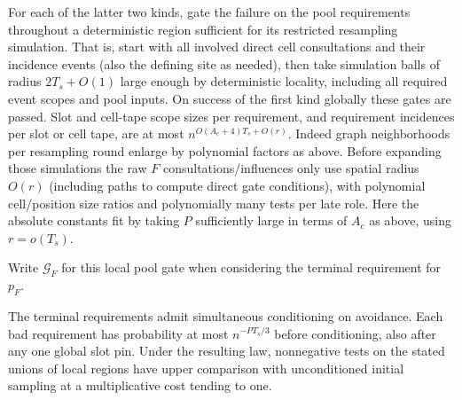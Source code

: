 For each of the latter two kinds, gate the failure on the pool requirements throughout a deterministic region sufficient for its restricted resampling simulation. That is, start with all involved direct cell consultations and their incidence events (also the defining site as needed), then take simulation balls of radius \(2T_s+O(1)\) large enough by deterministic locality, including all required event scopes and pool inputs. On success of the first kind globally these gates are passed. Slot and cell-tape scope sizes per requirement, and requirement incidences per slot or cell tape, are at most
\(n^{O(A_c+4)T_s+O(r)}\). Indeed graph neighborhoods per resampling round enlarge by polynomial factors as above. Before expanding those simulations the raw \(F\) consultations/influences only use spatial radius \(O(r)\) (including paths to compute direct gate conditions), with polynomial cell/position size ratios and polynomially many tests per late role. Here the absolute constants fit by taking \(P\) sufficiently large in terms of \(A_c\) as above, using \(r=o(T_s)\).

Write \(\mathcal G_F\) for this local pool gate when considering the
terminal requirement for \(p_F\).

\begin{proposition}\label{prop:terminal-avoidance}
The terminal requirements admit simultaneous conditioning on avoidance. Each bad requirement has probability at most \(n^{-PT_s/3}\) before conditioning, also after any one global slot pin. Under the resulting law, nonnegative tests on the stated unions of local regions have upper comparison with unconditioned initial sampling at a multiplicative cost tending to one.
\end{proposition}

